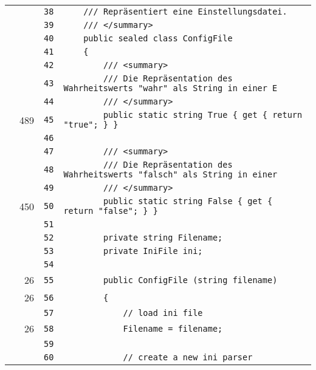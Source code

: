 \documentclass[a4paper,10pt]{article}
\begin{document}
\begin{longtable}[l]{lrrl}
\cellcolor{gray} &  & \verb~38~ & \verb~    /// Repräsentiert eine Einstellungsdatei.~\\
\cellcolor{gray} &  & \verb~39~ & \verb~    /// </summary>~\\
\cellcolor{gray} &  & \verb~40~ & \verb~    public sealed class ConfigFile~\\
\cellcolor{gray} &  & \verb~41~ & \verb~    {~\\
\cellcolor{gray} &  & \verb~42~ & \verb~        /// <summary>~\\
\cellcolor{gray} &  & \verb~43~ & \verb~        /// Die Repräsentation des Wahrheitswerts "wahr" als String in einer E~\\
\cellcolor{gray} &  & \verb~44~ & \verb~        /// </summary>~\\
\cellcolor{green} & 489 & \verb~45~ & \verb~        public static string True { get { return "true"; } }~\\
\cellcolor{gray} &  & \verb~46~ & \verb~~\\
\cellcolor{gray} &  & \verb~47~ & \verb~        /// <summary>~\\
\cellcolor{gray} &  & \verb~48~ & \verb~        /// Die Repräsentation des Wahrheitswerts "falsch" als String in einer~\\
\cellcolor{gray} &  & \verb~49~ & \verb~        /// </summary>~\\
\cellcolor{green} & 450 & \verb~50~ & \verb~        public static string False { get { return "false"; } }~\\
\cellcolor{gray} &  & \verb~51~ & \verb~~\\
\cellcolor{gray} &  & \verb~52~ & \verb~        private string Filename;~\\
\cellcolor{gray} &  & \verb~53~ & \verb~        private IniFile ini;~\\
\cellcolor{gray} &  & \verb~54~ & \verb~~\\
\cellcolor{green} & 26 & \verb~55~ & \verb~        public ConfigFile (string filename)~\\
\cellcolor{green} & 26 & \verb~56~ & \verb~        {~\\
\cellcolor{gray} &  & \verb~57~ & \verb~            // load ini file~\\
\cellcolor{green} & 26 & \verb~58~ & \verb~            Filename = filename;~\\
\cellcolor{gray} &  & \verb~59~ & \verb~~\\
\cellcolor{gray} &  & \verb~60~ & \verb~            // create a new ini parser~\\

\end{longtable}
\end{document}
